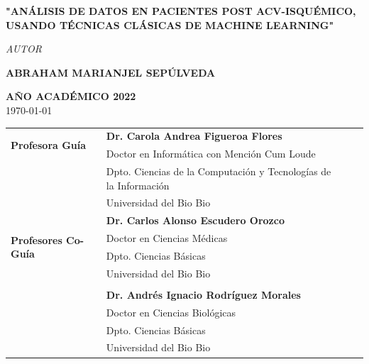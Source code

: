 \begin{frontmatter}
\begin{titlepage}
\begin{center}
			\begin{center}
				\begin{Huge}
				
					{\textbf{"{ANÁLISIS} DE DATOS EN PACIENTES POST ACV-ISQUÉMICO, USANDO TÉCNICAS CLÁSICAS DE MACHINE LEARNING"}}
					
				\end{Huge}
			\end{center}

			\vspace{3cm}
			\textit{\large AUTOR}\\[0.5cm]
			\begin{large}
				\textbf{\large ABRAHAM MARIANJEL SEPÚLVEDA}\\[1.5cm]
			\end{large}
				\textbf{AÑO ACADÉMICO 2022}\\[0.5cm]	
				{\large \today}
			
				\vfill
		\end{center}
	\end{titlepage}
	\newpage{\ }
	\thispagestyle{empty}
	\begin{flushleft}
	\doublespacing %
		\begin{tabular}{ l | l l l}
			\multirow{2}{2.8cm}{\textbf{\large Profesora Guía}} & {\textbf{\large Dr. Carola Andrea Figueroa Flores}}\\
			& {Doctor en Informática con Mención Cum Loude}\\
			& {Dpto. Ciencias de la Computación y Tecnologías de la Información}\\
			\vspace{1.5cm}
			& {Universidad del Bio Bio}\\
			
			\multirow{4}{2.8cm}{\textbf{\large Profesores Co-Guía}} & {\textbf{\large Dr. Carlos Alonso Escudero Orozco}}\\
			& {Doctor en Ciencias Médicas}\\
			& {Dpto. Ciencias Básicas}\\
			& {Universidad del Bio Bio}\\
			\\
			&{\textbf{\large Dr. Andrés Ignacio Rodríguez Morales}}\\
			& {Doctor en Ciencias Biológicas}\\
			& {Dpto. Ciencias Básicas}\\
			\vspace{1.5cm}
			& {Universidad del Bio Bio}\\


\end{tabular}
\end{flushleft}
\end{frontmatter}
